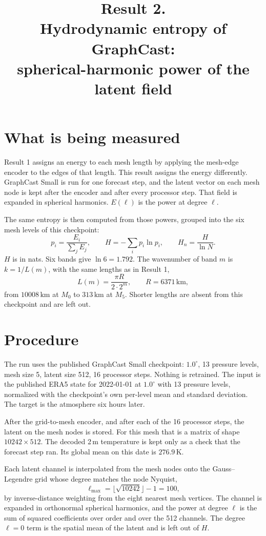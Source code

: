 \documentclass[11pt]{article}
\title{Result 2.\\
Hydrodynamic entropy of GraphCast:\\
spherical-harmonic power of the latent field}
\author{}
\date{}
\begin{document}
\maketitle

\section{What is being measured}

Result 1 assigns an energy to each mesh length by applying the mesh-edge encoder to the edges of that length. This result assigns the energy differently. GraphCast Small is run for one forecast step, and the latent vector on each mesh node is kept after the encoder and after every processor step. That field is expanded in spherical harmonics. \(E(\ell)\) is the power at degree \(\ell\).

The same entropy is then computed from those powers, grouped into the six mesh levels of this checkpoint:
\[
p_i = \frac{E_i}{\sum_j E_j},
\qquad
H = -\sum_i p_i \ln p_i,
\qquad
H_n = \frac{H}{\ln N}.
\]
\(H\) is in nats. Six bands give \(\ln 6 = 1.792\). The wavenumber of band \(m\) is \(k = 1/L(m)\), with the same lengths as in Result 1,
\[
L(m) = \frac{\pi R}{2 \cdot 2^{m}}, \qquad R = 6371\,\mathrm{km},
\]
from \(10008\,\mathrm{km}\) at \(M_0\) to \(313\,\mathrm{km}\) at \(M_5\). Shorter lengths are absent from this checkpoint and are left out.

\section{Procedure}

The run uses the published GraphCast Small checkpoint: \(1.0^\circ\), 13 pressure levels, mesh size 5, latent size 512, 16 processor steps. Nothing is retrained. The input is the published ERA5 state for 2022-01-01 at \(1.0^\circ\) with 13 pressure levels, normalized with the checkpoint's own per-level mean and standard deviation. The target is the atmosphere six hours later.

After the grid-to-mesh encoder, and after each of the 16 processor steps, the latent on the mesh nodes is stored. For this mesh that is a matrix of shape \(10242 \times 512\). The decoded 2\,m temperature is kept only as a check that the forecast step ran. Its global mean on this date is \(276.9\,\mathrm{K}\).

Each latent channel is interpolated from the mesh nodes onto the Gauss--Legendre grid whose degree matches the node Nyquist,
\[
\ell_{\max} = \big\lfloor \sqrt{10242} \big\rfloor - 1 = 100,
\]
by inverse-distance weighting from the eight nearest mesh vertices. The channel is expanded in orthonormal spherical harmonics, and the power at degree \(\ell\) is the sum of squared coefficients over order and over the 512 channels. The degree \(\ell = 0\) term is the spatial mean of the latent and is left out of \(H\).
\end{document}
